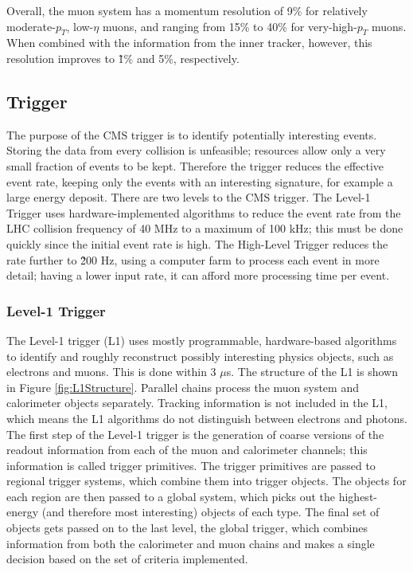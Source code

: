 Overall, the muon system has a momentum resolution 
of 9\% for relatively moderate-$p_T$, low-$\eta$ muons, 
and ranging from 15\% to 40\% for very-high-$p_T$ muons.  
When combined with the information from the inner tracker, 
however, this resolution improves to \~1\% and 5\%, respectively.  

\subsection{Trigger}
\label{exp:trigger}
The purpose of the CMS trigger is to 
identify potentially interesting events.  
Storing the data from every collision is unfeasible; 
resources allow only a very small fraction of events to be kept.  
Therefore the trigger reduces the effective event rate, 
keeping only the events with an interesting signature, 
for example a large energy deposit.  
There are two levels to the CMS trigger.  
The Level-1 Trigger uses hardware-implemented algorithms to 
reduce the event rate from the LHC collision frequency of 40 MHz 
to a maximum of 100 kHz; 
this must be done quickly since the initial event rate is high. 
The High-Level Trigger reduces the rate further to \~200 Hz, %
using a computer farm to process each event in more detail; 
having a lower input rate, it can afford more processing time per event.  


\subsubsection{Level-1 Trigger}
\label{exp:L1}

The Level-1 trigger (L1) \cite{TriggerTDR} 
uses mostly programmable, hardware-based algorithms 
to identify and roughly reconstruct possibly interesting physics objects, 
such as electrons and muons.  
This is done within 3 $\mu$s.  
The structure of the L1 is shown in Figure \ref{fig:L1Structure}.  
Parallel chains process the muon system and calorimeter objects separately. 
Tracking information is not included in the L1, 
which means the L1 algorithms do not distinguish 
between electrons and photons. 
The first step of the Level-1 trigger is the generation 
of coarse versions of the readout information 
from each of the muon and calorimeter channels; 
this information is called trigger primitives.  
The trigger primitives are passed to regional trigger systems, 
which combine them into trigger objects.  
The objects for each region are then passed to a global system, 
which picks out the highest-energy (and therefore most interesting) 
objects of each type.
The final set of objects gets passed on to the last level, 
the global trigger, which combines information from both 
the calorimeter and muon chains 
and makes a single decision based on the set of criteria implemented.  

